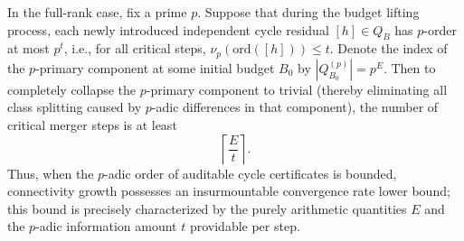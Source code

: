 \begin{conclusion}\label{con:xi-merge-depth-lower-bound-padic}
In the full-rank case, fix a prime \(p\).
Suppose that during the budget lifting process, each newly introduced independent cycle residual \([h]\in Q_B\) has \(p\)-order at most \(p^{t}\), i.e., for all critical steps,
\(
\nu_p(\mathrm{ord}([h]))\le t
\).
Denote the index of the \(p\)-primary component at some initial budget \(B_0\) by \(|Q_{B_0}^{(p)}|=p^{E}\).
Then to completely collapse the \(p\)-primary component to trivial (thereby eliminating all class splitting caused by \(p\)-adic differences in that component), the number of critical merger steps is at least
\[
\left\lceil \frac{E}{t}\right\rceil.
\]
Thus, when the \(p\)-adic order of auditable cycle certificates is bounded, connectivity growth possesses an insurmountable convergence rate lower bound; this bound is precisely characterized by the purely arithmetic quantities \(E\) and the \(p\)-adic information amount \(t\) providable per step.
\end{conclusion}

